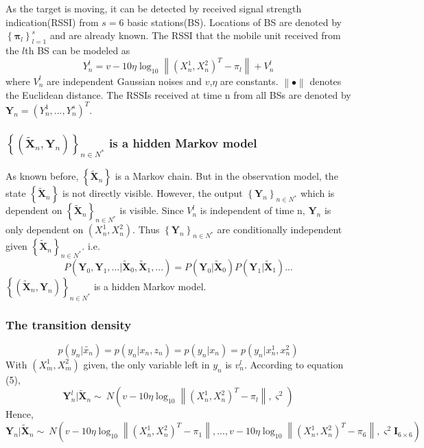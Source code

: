 \documentclass{article}
\begin{document}
As the target is moving, it can be detected by received signal strength indication(RSSI) from $s=6$ basic stations(BS). Locations of BS are denoted by $\left\{\boldsymbol{\pi}_l\right\}_{l=1}^s$ and are already known. The RSSI that the mobile unit received from the $l$th BS can be modeled as 
\begin{equation}
    Y_n^l= v-10\eta\log_{10} \left \| (X_n^1,X_n^2)^T-\pi_l \right \|+V_n^l
\end{equation}
where $V_n^l$ are independent Gaussian noises and $v$,$\eta$ are constants. $\left \|\bullet\right \|$ denotes the Euclidean distance.
The RSSIs received at time n from all BSs are denoted by $\boldsymbol{Y}_n=(Y_n^1,...,Y_n^s)^T$.

\subsubsection{$\left\{(\tilde{\boldsymbol{X}}_n,\boldsymbol{Y}_n)\right\}_{n\in{N^*}}$ is a hidden Markov model}
As known before, $\left\{\tilde{\boldsymbol{X}}_n\right\}$ is a Markov chain. But in the observation model, the state $\left\{\tilde{\boldsymbol{X}}_n\right\}$ is not directly visible. However, the output ${\left\{\boldsymbol{Y}_n\right\}}_{n\in{N^*}}$ which is dependent on $\left\{\tilde{\boldsymbol{X}}_n\right\}_{n\in{N^*}}$ is visible. Since $V_n^l$ is independent of time n, $\boldsymbol{Y}_n$ is only dependent on $(X_n^1,X_n^2)$. Thus ${\left\{\boldsymbol{Y}_n\right\}}_{n\in{N^*}}$ are conditionally independent given $\left\{\tilde{\boldsymbol{X}}_n\right\}_{n\in{N^*}}$. i.e.
\begin{equation}
    P(\boldsymbol{Y}_0,\boldsymbol{Y}_1,...|\tilde{\boldsymbol{X}}_0,\tilde{\boldsymbol{X}}_1,...)=P(\boldsymbol{Y}_0|\tilde{\boldsymbol{X}}_0)P(\boldsymbol{Y}_1|\tilde{\boldsymbol{X}}_1)...
\end{equation}
$\left\{(\tilde{\boldsymbol{X}}_n,\boldsymbol{Y}_n)\right\}_{n\in{N^*}}$ is a hidden Markov model.

\subsubsection{The transition density}

\begin{equation}
    p(y_n|\tilde{x_n})=p(y_n|{x_n},z_n)=p(y_n|{x_n})=p(y_n|x_n^1,x_n^2)
\end{equation}
With $(X_m^1,X_m^2)$ given, the only variable left in $y_n$ is $v_n^l$. According to equation (5), 
\begin{equation}
    \boldsymbol{Y}_n^l|\tilde{\boldsymbol{X}}_n \sim\ N(v-10\eta\log_{10} \left \| (X_n^1,X_n^2)^T-\pi_l \right \|,\varsigma^2)
\end{equation}
Hence,
\begin{equation}
    \boldsymbol{Y}_n|\tilde{\boldsymbol{X}}_n \sim\ N(v-10\eta\log_{10} \left \| (X_n^1,X_n^2)^T-\pi_1 \right \|,...,v-10\eta\log_{10} \left \| (X_n^1,X_n^2)^T-\pi_6 \right \|,\varsigma^2\boldsymbol{I}_{6\times6})
\end{equation}
\end{document}
